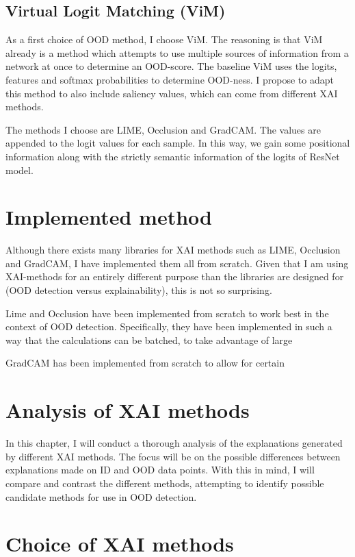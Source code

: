 \documentclass[UKenglish]{uiomasterthesis} %
\theoremstyle{definition}
\begin{document}
\subsection{Virtual Logit Matching (ViM)}

As a first choice of OOD method, I choose ViM. The reasoning is that ViM already is a method which attempts to use multiple sources of information from a network at once to determine an OOD-score. The baseline ViM uses the logits, features and softmax probabilities to determine OOD-ness. I propose to adapt this method to also include saliency values, which can come from different XAI methods.

The methods I choose are LIME, Occlusion and GradCAM. The values are appended to the logit values for each sample. In this way, we gain some positional information along with the strictly semantic information of the logits of ResNet model.

\section{Implemented method}

Although there exists many libraries for XAI methods such as LIME, Occlusion and GradCAM, I have implemented them all from scratch. Given that I am using XAI-methods for an entirely different purpose than the libraries are designed for (OOD detection versus explainability), this is not so surprising.

Lime and Occlusion have been implemented from scratch to work best in the context of OOD detection. Specifically, they have been implemented in such a way that the calculations can be batched, to take advantage of large 

GradCAM has been implemented from scratch to allow for certain

\section{Analysis of XAI methods}


In this chapter, I will conduct a thorough analysis of the explanations generated by different XAI methods. The focus will be on the possible differences between explanations made on ID and OOD data points. With this in mind, I will compare and contrast the different methods, attempting to identify possible candidate methods for use in OOD detection.

\section{Choice of XAI methods}
\end{document}
